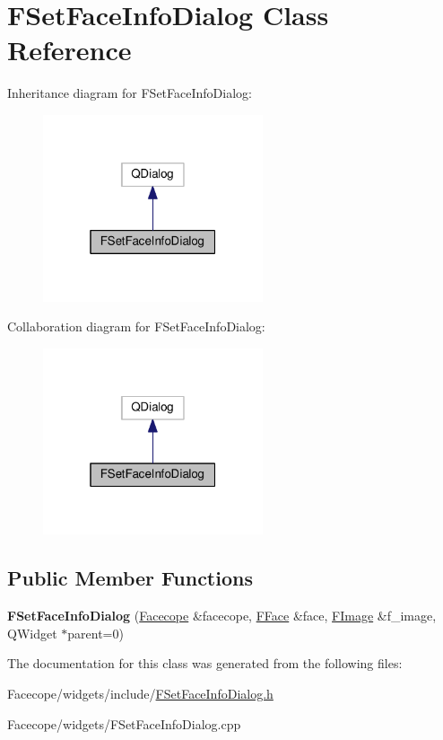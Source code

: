 \hypertarget{classFSetFaceInfoDialog}{}\section{F\+Set\+Face\+Info\+Dialog Class Reference}
\label{classFSetFaceInfoDialog}


Inheritance diagram for F\+Set\+Face\+Info\+Dialog\+:
\nopagebreak
\begin{figure}[H]
\begin{center}
\leavevmode
\includegraphics[width=184pt]{classFSetFaceInfoDialog__inherit__graph}
\end{center}
\end{figure}


Collaboration diagram for F\+Set\+Face\+Info\+Dialog\+:
\nopagebreak
\begin{figure}[H]
\begin{center}
\leavevmode
\includegraphics[width=184pt]{classFSetFaceInfoDialog__coll__graph}
\end{center}
\end{figure}
\subsection*{Public Member Functions}
\begin{DoxyCompactItemize}
\item 
\mbox{\label{classFSetFaceInfoDialog_abbab58f313b3091cfd917b53f1590e9e}} 
{\bfseries F\+Set\+Face\+Info\+Dialog} (\hyperlink{structFacecope}{Facecope} \&facecope, \hyperlink{classFFace}{F\+Face} \&face, \hyperlink{classFImage}{F\+Image} \&f\+\_\+image, Q\+Widget $\ast$parent=0)
\end{DoxyCompactItemize}


The documentation for this class was generated from the following files\+:\begin{DoxyCompactItemize}
\item 
Facecope/widgets/include/\hyperlink{FSetFaceInfoDialog_8h}{F\+Set\+Face\+Info\+Dialog.\+h}\item 
Facecope/widgets/F\+Set\+Face\+Info\+Dialog.\+cpp\end{DoxyCompactItemize}
